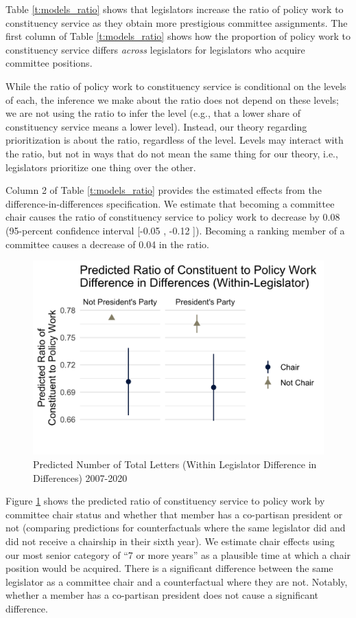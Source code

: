 \documentclass[12pt]{article}
\begin{document}
Table \ref{t:models_ratio} shows that legislators increase the ratio of policy work to constituency service as they obtain more 
prestigious committee assignments. The first column of Table \ref{t:models_ratio} shows how the proportion of policy work to constituency service differs \textit{across} legislators
for legislators who acquire committee positions. 

While the ratio of policy work to constituency service is conditional on the levels of each, the inference we make about the ratio does not depend on these levels; we are not using the ratio to infer the level (e.g., that a lower share of constituency service means a lower level). Instead, our theory regarding prioritization is about the ratio, regardless of the level. Levels may interact with the ratio, but not in ways that do not mean the same thing for our theory, i.e., legislators prioritize one thing over the other. 

Column 2 of Table \ref{t:models_ratio} provides the estimated effects from the difference-in-differences specification.
We estimate that becoming a committee chair causes the ratio of constituency service to policy work to decrease by 0.08 (95-percent confidence interval [-0.05 , -0.12 ]). Becoming a ranking member of a committee causes a decrease of 0.04 in the ratio.

\begin{figure}[hbt!]
\centering
\caption{Predicted Number of Total Letters (Within Legislator Difference in Differences) 2007-2020} \label{f:m-ratio-predicted}
\includegraphics[width = .8\textwidth]{figs/m-ratio-predicted-3}
\end{figure}

Figure \ref{f:m-ratio-predicted} shows the predicted ratio of constituency service to policy work by committee chair status and whether that member has a co-partisan president or not (comparing predictions for counterfactuals where the same legislator did and did not receive a chairship in their sixth year). We estimate chair effects using our most senior category of ``7 or more years'' as a plausible time at which a chair position would be acquired. %
There is a significant difference between the same legislator as a committee chair and a counterfactual where they are not. Notably, whether a member has a co-partisan president does not cause a significant difference. 
\end{document}
